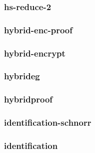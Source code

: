 \begin{frame}\frametitle{hs-reduce-2}
\begin{figure}
\begin{center}

\end{center}
\end{figure}
\end{frame}
\begin{frame}\frametitle{hybrid-enc-proof}
\begin{figure}
\begin{center}

\end{center}
\end{figure}
\end{frame}
\begin{frame}\frametitle{hybrid-encrypt}
\begin{figure}
\begin{center}

\end{center}
\end{figure}
\end{frame}
\begin{frame}\frametitle{hybrideg}
\begin{figure}
\begin{center}

\end{center}
\end{figure}
\end{frame}
\begin{frame}\frametitle{hybridproof}
\begin{figure}
\begin{center}

\end{center}
\end{figure}
\end{frame}
\begin{frame}\frametitle{identification-schnorr}
\begin{figure}
\begin{center}

\end{center}
\end{figure}
\end{frame}
\begin{frame}\frametitle{identification}
\begin{figure}
\begin{center}

\end{center}
\end{figure}
\end{frame}
